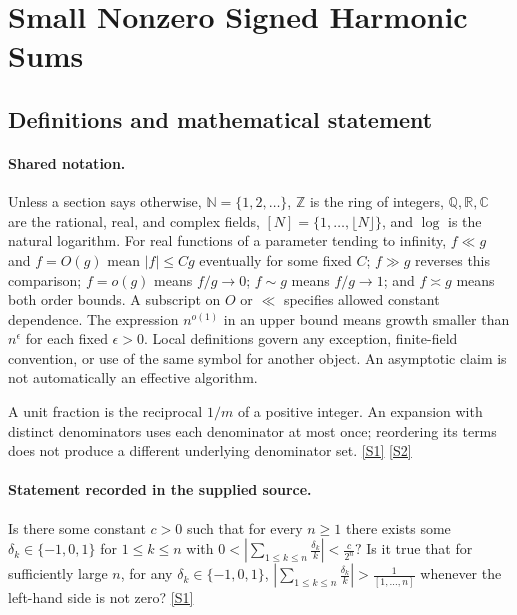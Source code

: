 \documentclass[11pt,a4paper]{article}
\newcommand{\N}{\mathbb{N}}
\newcommand{\Z}{\mathbb{Z}}
\newcommand{\Q}{\mathbb{Q}}
\newcommand{\R}{\mathbb{R}}
\newcommand{\C}{\mathbb{C}}
\newcommand{\sref}[2]{\hyperlink{source:#1:#2}{[S#2]}}
\begin{document}
\section{Small Nonzero Signed Harmonic Sums}\label{statement}


\subsection{Definitions and mathematical statement}

\paragraph{Shared notation.}Unless a section says otherwise, $\N=\{1,2,\ldots\}$,
$\Z$ is the ring of integers, $\Q,\R,\C$ are the rational, real, and complex
fields, $[N]=\{1,\ldots,\lfloor N\rfloor\}$, and $\log$ is the natural
logarithm. For real functions of a parameter tending to infinity,
$f\ll g$ and $f=O(g)$ mean $|f|\leq Cg$ eventually for some fixed $C$;
$f\gg g$ reverses this comparison; $f=o(g)$ means $f/g\to0$;
$f\sim g$ means $f/g\to1$; and $f\asymp g$ means both order bounds.
A subscript on $O$ or $\ll$ specifies allowed constant dependence.
The expression $n^{o(1)}$ in an upper bound means growth smaller than
$n^\epsilon$ for each fixed $\epsilon>0$. Local definitions govern any
exception, finite-field convention, or use of the same symbol for another
object. An asymptotic claim is not automatically an effective algorithm.



A unit fraction is the reciprocal $1/m$ of a positive integer. An expansion with distinct denominators uses each denominator at most once; reordering its terms does not produce a different underlying denominator set. \sref{statement}{1} \sref{statement}{2}

\paragraph{Statement recorded in the supplied source.}
Is there some constant $c>0$ such that for every $n\geq 1$ there exists some $\delta_k\in \{-1,0,1\}$ for $1\leq k\leq n$ with $ 0< \left\lvert \sum_{1\leq k\leq n}\frac{\delta_k}{k}\right\rvert < \frac{c}{2^n}? $ Is it true that for sufficiently large $n$, for any $\delta_k\in \{-1,0,1\}$, $ \left\lvert \sum_{1\leq k\leq n}\frac{\delta_k}{k}\right\rvert > \frac{1}{[1,\ldots,n]} $ whenever the left-hand side is not zero? \sref{statement}{1}
\end{document}
